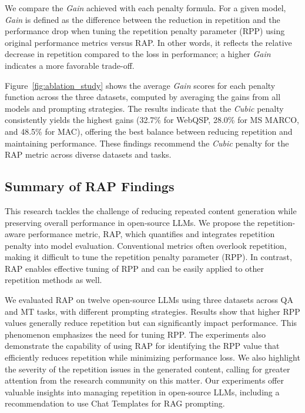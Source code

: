 We compare the \textit{Gain} achieved with each penalty formula. For a given model, \textit{Gain} is defined as the difference between the reduction in repetition and the performance drop when tuning the repetition penalty parameter (RPP) using original performance metrics versus RAP. In other words, it reflects the relative decrease in repetition compared to the loss in performance; a higher \textit{Gain} indicates a more favorable trade-off.

Figure~\ref{fig:ablation_study} shows the average \textit{Gain} scores for each penalty function across the three datasets, computed by averaging the gains from all models and prompting strategies. The results indicate that the \textit{Cubic} penalty consistently yields the highest gains (32.7\% for WebQSP, 28.0\% for MS MARCO, and 48.5\% for MAC), offering the best balance between reducing repetition and maintaining performance. These findings recommend the \textit{Cubic} penalty for the RAP metric across diverse datasets and tasks.

\subsection{Summary of RAP Findings}

This research tackles the challenge of reducing repeated content generation while preserving overall performance in open-source LLMs. We propose the repetition-aware performance metric, RAP, which quantifies and integrates repetition penalty into model evaluation. Conventional metrics often overlook repetition, making it difficult to tune the repetition penalty parameter (RPP). In contrast, RAP enables effective tuning of RPP and can be easily applied to other repetition methods as well.

We evaluated RAP on twelve open-source LLMs using three datasets across QA and MT tasks, with different prompting strategies. Results show that higher RPP values generally reduce repetition but can significantly impact performance. This phenomenon emphasizes the need for tuning RPP. 
The experiments also demonstrate the capability of using RAP for identifying the RPP value that efficiently reduces repetition while minimizing performance loss.
We also highlight the severity of the repetition issues in the generated content, calling for greater attention from the research community on this matter.
Our experiments offer valuable insights into managing repetition in open-source LLMs, including a recommendation to use Chat Templates for RAG prompting.

